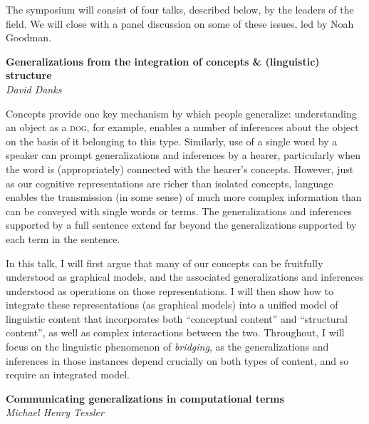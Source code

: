 \documentclass[10pt,letterpaper]{article}
\begin{document}
The symposium will consist of four talks, described below, by the leaders of the field.
We will close with a panel discussion on some of these issues, led by Noah Goodman.

\noindent\textbf{Generalizations from the integration of concepts \& (linguistic) structure} \\
\noindent\emph{David Danks}

Concepts provide one key mechanism by which people generalize: understanding an object as a \textsc{dog}, for example, enables a number of inferences about the object on the basis of it belonging to this type. 
Similarly, use of a single word by a speaker can prompt generalizations and inferences by a hearer, particularly when the word is (appropriately) connected with the hearer's concepts. 
However, just as our cognitive representations are richer than isolated concepts, language enables the transmission (in some sense) of much more complex information than can be conveyed with single words or terms. 
The generalizations and inferences supported by a full sentence extend far beyond the generalizations supported by each term in the sentence. 

In this talk, I will first argue that many of our concepts can be fruitfully understood as graphical models, and the associated generalizations and inferences understood as operations on those representations. 
I will then show how to integrate these representations (as graphical models) into a unified model of linguistic content that incorporates both ``conceptual content'' and ``structural content'', as well as complex interactions between the two. 
Throughout, I will focus on the linguistic phenomenon of \emph{bridging}, as the generalizations and inferences in those instances depend crucially on both types of content, and so require an integrated model.

\noindent\textbf{Communicating generalizations in computational terms} \\
\noindent\emph{Michael Henry Tessler}

\end{document}
